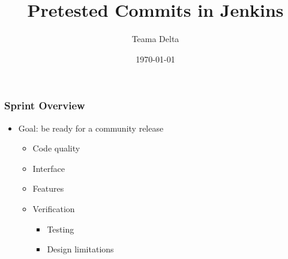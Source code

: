 \documentclass[t]{beamer}
\begin{document}
\title{Pretested Commits in Jenkins} %

\author[]{Teama Delta} %
\date[]{\today} %


\frame[plain]{\titlepage}


\begin{frame}
\frametitle{Sprint Overview}

\vspace{1.3cm}

\begin{itemize}
	\item Goal: be ready for a community release
	\begin{itemize}
		\item Code quality
		\item Interface
		\item Features
		\item Verification
		\begin{itemize}
			\item Testing
			\item Design limitations
		\end{itemize}
	\end{itemize}
\end{itemize}

\end{frame}

\end{document}
